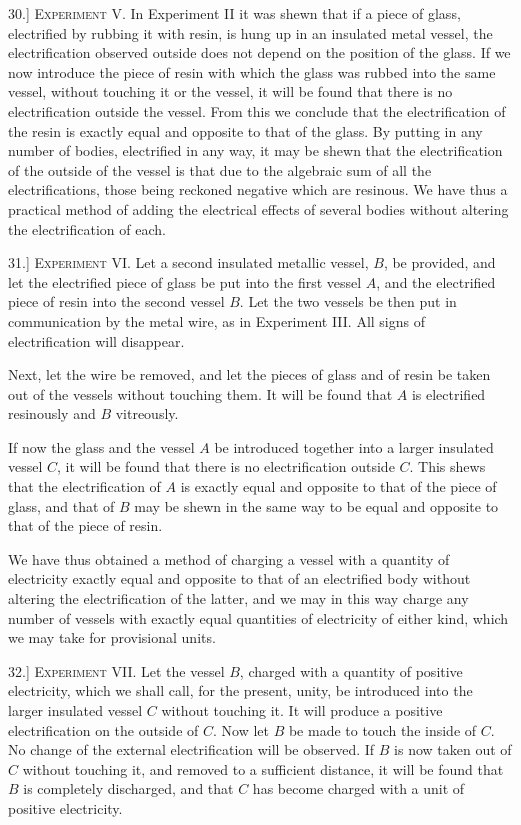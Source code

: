\documentclass[11pt,a4paper]{article}
\begin{document}
30.] \textsc{Experiment V.} In Experiment II it was shewn that if a
piece of glass, electrified by rubbing it with resin, is hung up in an
insulated metal vessel, the electrification observed outside does not
depend on the position of the glass. If we now introduce the piece of
resin with which the glass was rubbed into the same vessel, without
touching it or the vessel, it will be found that there is no
electrification outside the vessel. From this we conclude that the
electrification of the resin is exactly equal and opposite to that of
the glass. By putting in any number of bodies, electrified in any way,
it may be shewn that the electrification of the outside of the vessel is
that due to the algebraic sum of all the electrifications, those being
reckoned negative which are resinous. We have thus a practical method
of adding the electrical effects of several bodies without altering the
electrification of each.

31.] \textsc{Experiment VI.} Let a second insulated metallic vessel,
\(B\), be provided, and let the electrified piece of glass be put into
the first vessel \(A\), and the electrified piece of resin into the
second vessel \(B\). Let the two vessels be then put in communication by
the metal wire, as in Experiment III. All signs of electrification will
disappear.

Next, let the wire be removed, and let the pieces of glass and of resin
be taken out of the vessels without touching them. It will be found that
\(A\) is electrified resinously and \(B\) vitreously.

If now the glass and the vessel \(A\) be introduced together into a
larger insulated vessel \(C\), it will be found that there is no
electrification outside \(C\). This shews that the electrification of
\(A\) is exactly equal and opposite to that of the piece of glass, and
that of \(B\) may be shewn in the same way to be equal and opposite to
that of the piece of resin.

\clearpage
\setcounter{footnote}{0}

We have thus obtained a method of charging a vessel with a quantity of
electricity exactly equal and opposite to that of an electrified body
without altering the electrification of the latter, and we may in this
way charge any number of vessels with exactly equal quantities of
electricity of either kind, which we may take for provisional units.

32.] \textsc{Experiment VII.} Let the vessel \(B\), charged with a
quantity of positive electricity, which we shall call, for the present,
unity, be introduced into the larger insulated vessel \(C\) without
touching it. It will produce a positive electrification on the outside
of \(C\). Now let \(B\) be made to touch the inside of \(C\). No change
of the external electrification will be observed. If \(B\) is now taken
out of \(C\) without touching it, and removed to a sufficient distance,
it will be found that \(B\) is completely discharged, and that \(C\) has
become charged with a unit of positive electricity.
\end{document}
